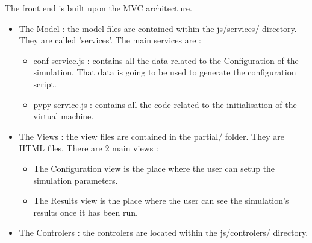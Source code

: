 \documentclass[10pt,a4paper]{article}
\begin{document}
The front end is built upon the MVC architecture.
\begin{itemize}
\item The Model : the model files are contained within the js/services/ directory. They are called 'services'. The main services are :
	\begin{itemize}
	\item conf-service.js : contains all the data related to the Configuration of the simulation. That data is going to be used to generate the configuration script.
	\item pypy-service.js : contains all the code related to the initialisation of the virtual machine.
	\end{itemize}
\item The Views : the view files are contained in the partial/ folder. They are HTML files. There are 2 main views : 
\begin{itemize}
\item The Configuration view is the place where the user can setup the simulation parameters.
\item The Results view is the place where the user can see the simulation's results once it has been run.
\end{itemize}

\item The Controlers : the controlers are located within the js/controlers/ directory. 

\end{itemize}


\pagebreak
\end{document}
